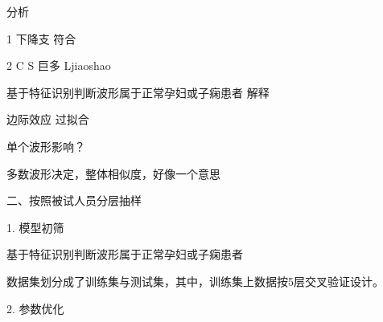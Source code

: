 分析

1 下降支 符合

2 C S 巨多 Ljiaoshao

基于特征识别判断波形属于正常孕妇或子痫患者
解释

边际效应
过拟合

单个波形影响？

多数波形决定，整体相似度，好像一个意思





二、按照被试人员分层抽样

1. 模型初筛

基于特征识别判断波形属于正常孕妇或子痫患者



数据集划分成了训练集与测试集，其中，训练集上数据按5层交叉验证设计。

2. 参数优化


